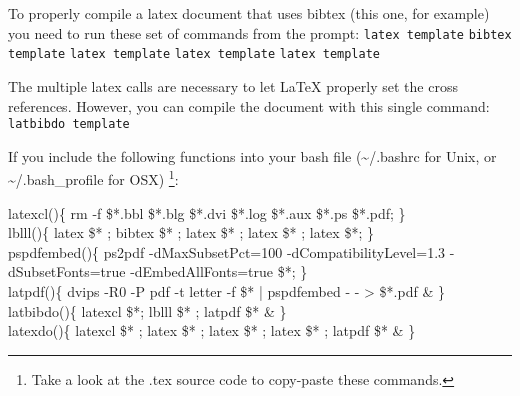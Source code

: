 To properly compile a latex document that uses bibtex (this one, for
example) you need to run these set of commands from the prompt:
\newline
\indent \texttt{latex template} \newline
\indent \texttt{bibtex template} \newline
\indent \texttt{latex template} \newline
\indent \texttt{latex template} \newline
\indent \texttt{latex template} \newline

The multiple latex calls are necessary to let LaTeX properly set the
cross references.  However, you can compile the document with this single command: \newline
\indent \texttt{latbibdo template} \newline

If you include the following functions into your bash file
(\sim/.bashrc for Unix, or \sim/.bash\_profile for OSX)%
\footnote{Take a look at the .tex source code to copy-paste these
  commands.}: \newline

\footnotesize \noindent
latexcl()\{ rm -f \$*.bbl \$*.blg \$*.dvi \$*.log \$*.aux \$*.ps \$*.pdf; \} \\
lblll()\{ latex \$* ; bibtex \$* ; latex \$* ; latex \$* ; latex \$*; \} \\
pspdfembed()\{ ps2pdf -dMaxSubsetPct=100 -dCompatibilityLevel=1.3 -dSubsetFonts=true -dEmbedAllFonts=true \$*; \} \\
latpdf()\{ dvips -R0 -P pdf -t letter -f \$* | pspdfembed - - > \$*.pdf \& \} \\
latbibdo()\{ latexcl \$*; lblll \$* ; latpdf \$* \& \} \\
latexdo()\{ latexcl \$* ; latex \$* ; latex \$* ; latex \$* ; latpdf \$* \& \} \\
\normalsize


